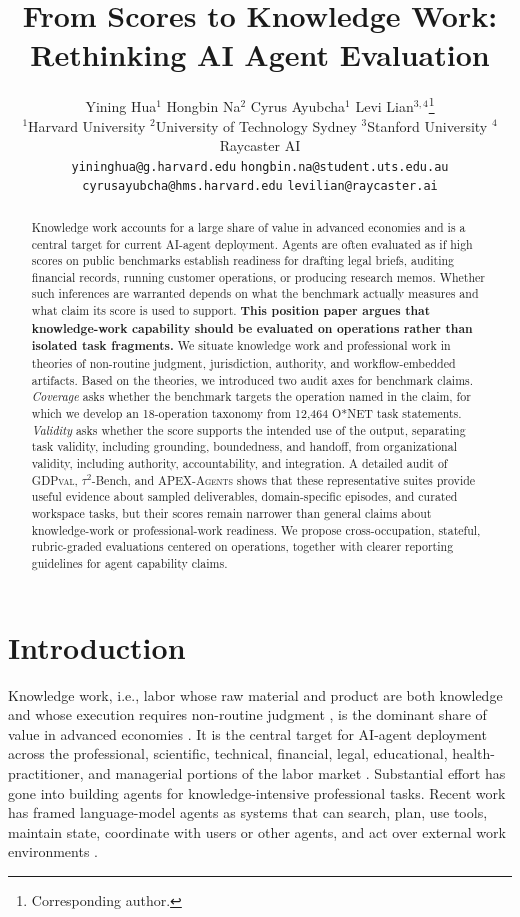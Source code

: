 \documentclass{article}
\title{From Scores to Knowledge Work: Rethinking AI Agent Evaluation}
\author{%
  Yining Hua$^{1}$\quad
  Hongbin Na$^{2}$\quad
  Cyrus Ayubcha$^{1}$ \quad
  Levi Lian$^{3,4}$\thanks{Corresponding author.} \\[0.4em]
  \small $^{1}$Harvard University \quad
  $^{2}$University of Technology Sydney \quad
  $^{3}$Stanford University \quad
  $^{4}$Raycaster AI \\[0.4em]
  \small \texttt{yininghua@g.harvard.edu} \quad
  \texttt{hongbin.na@student.uts.edu.au} \\
  \texttt{cyrusayubcha@hms.harvard.edu} \quad
  \texttt{levilian@raycaster.ai}
}
\begin{document}
\maketitle

\begin{abstract}
Knowledge work accounts for a large share of value in advanced economies and is a central target for current AI-agent deployment.
Agents are often evaluated as if high scores on public benchmarks establish readiness for drafting legal briefs, auditing financial records, running customer operations, or producing research memos.
Whether such inferences are warranted depends on what the benchmark actually measures and what claim its score is used to support.
\textbf{This position paper argues that knowledge-work capability should be evaluated on operations rather than isolated task fragments.}
We situate knowledge work and professional work in theories of non-routine judgment, jurisdiction, authority, and workflow-embedded artifacts. Based on the theories, we introduced two audit axes for benchmark claims.
\textit{Coverage} asks whether the benchmark targets the operation named in the claim, for which we develop an 18-operation taxonomy from 12{,}464 O{*}NET task statements.
\textit{Validity} asks whether the score supports the intended use of the output, separating task validity, including grounding, boundedness, and handoff, from organizational validity, including authority, accountability, and integration.
A detailed audit of \textsc{GDPval}, $\tau^2$-Bench, and \textsc{APEX-Agents} shows that these representative suites provide useful evidence about sampled deliverables, domain-specific episodes, and curated workspace tasks, but their scores remain narrower than general claims about knowledge-work or professional-work readiness.
We propose cross-occupation, stateful, rubric-graded evaluations centered on operations, together with clearer reporting guidelines for agent capability claims.
\end{abstract}

\section{Introduction}
\label{sec:intro}

Knowledge work, i.e., labor whose raw material and product are both knowledge and whose execution requires non-routine judgment \citep{drucker1959landmarks}, is the dominant share of value in advanced economies \citep{machlup1962production,porat1977information,drucker1999productivity}. It is the central target for AI-agent deployment across the professional, scientific, technical, financial, legal, educational, health-practitioner, and managerial portions of the labor market \citep{onet2024tasks,davenport2005thinking,grant1996kbv}. Substantial effort has gone into building agents for knowledge-intensive professional tasks.
Recent work has framed language-model agents as systems that can search, plan, use tools, maintain state, coordinate with users or other agents, and act over external work environments \citep{nakano2021webgpt,karpas2022mrkl,yao2023react,schick2023toolformer,park2023generative,wu2023autogen,wang2024survey}.
\end{document}

